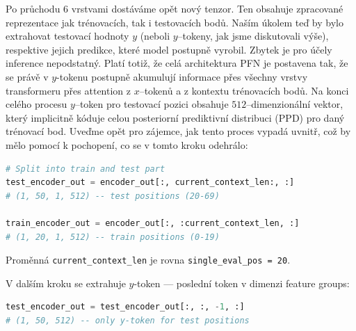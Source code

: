 Po průchodu $6$ vrstvami dostáváme opět nový tenzor.
Ten obsahuje zpracované reprezentace jak trénovacích, tak i testovacích bodů.
Naším úkolem teď by bylo extrahovat testovací hodnoty $y$ (neboli $y$–tokeny, jak jsme diskutovali výše), respektive jejich predikce, které model postupně vyrobil.
Zbytek je pro účely inference nepodstatný.
Platí totiž, že celá architektura PFN je postavena tak, že se právě v $y$-tokenu postupně akumulují informace přes všechny vrstvy transformeru přes attention z $x$–tokenů a z kontextu trénovacích bodů.
Na konci celého procesu $y$–token pro testovací pozici obsahuje $512$–dimenzionální vektor, který implicitně kóduje celou posteriorní prediktivní distribuci (PPD) pro daný trénovací bod.
Uveďme opět pro zájemce, jak tento proces vypadá uvnitř, což by mělo pomocí k pochopení, co se v tomto kroku odehrálo:
\begin{lstlisting}[language=Python]
# Split into train and test part
test_encoder_out = encoder_out[:, current_context_len:, :]
# (1, 50, 1, 512) -- test positions (20-69)

train_encoder_out = encoder_out[:, :current_context_len, :]
# (1, 20, 1, 512) -- train positions (0-19)
\end{lstlisting}

Proměnná \lstinline|current_context_len| je rovna \lstinline|single_eval_pos = 20|.

V dalším kroku se extrahuje $y$-token — poslední token v dimenzi feature groups:
\begin{lstlisting}[language=Python]
test_encoder_out = test_encoder_out[:, :, -1, :]
# (1, 50, 512) -- only y-token for test positions
\end{lstlisting}

